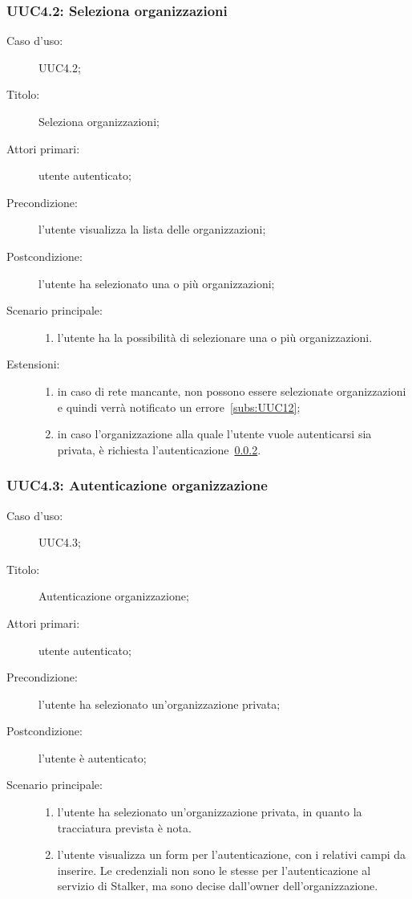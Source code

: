 \documentclass[../../../analisi-dei-requisiti.tex]{subfiles}
\begin{document}
\subsubsection{UUC4.2: Seleziona organizzazioni}%
\label{subs:UUC4.2}
\begin{description}
  \item[Caso d’uso:] UUC4.2;
  \item[Titolo:] Seleziona organizzazioni;
  \item[Attori primari:] utente autenticato;
  \item[Precondizione:] l'utente visualizza la lista delle organizzazioni;
  \item[Postcondizione:] l'utente ha selezionato una o più organizzazioni;
  \item[Scenario principale:]
        \begin{enumerate}
          \item l'utente ha la possibilità di selezionare una o più organizzazioni.
        \end{enumerate}
  \item[Estensioni:]
        \begin{enumerate}
          \item in caso di rete mancante, non possono essere selezionate organizzazioni e quindi verrà notificato un errore~\ref{subs:UUC12};
          \item in caso l'organizzazione alla quale l'utente vuole autenticarsi sia privata, è richiesta l'autenticazione~\ref{subs:UUC4.3}.
        \end{enumerate}
\end{description}

\subsubsection{UUC4.3: Autenticazione organizzazione}%
\label{subs:UUC4.3}
\begin{description}
  \item[Caso d’uso:] UUC4.3;
  \item[Titolo:] Autenticazione organizzazione;
  \item[Attori primari:] utente autenticato;
  \item[Precondizione:] l'utente ha selezionato un'organizzazione privata;
  \item[Postcondizione:] l'utente è autenticato;
  \item[Scenario principale:]
        \begin{enumerate}
          \item l'utente ha selezionato un'organizzazione privata, in quanto la tracciatura prevista è nota.
          \item l'utente visualizza un form per l'autenticazione, con i relativi campi da inserire. Le credenziali non sono le stesse per l'autenticazione al servizio di Stalker, ma sono decise dall'owner dell'organizzazione.
        \end{enumerate}
\end{description}
\end{document}
